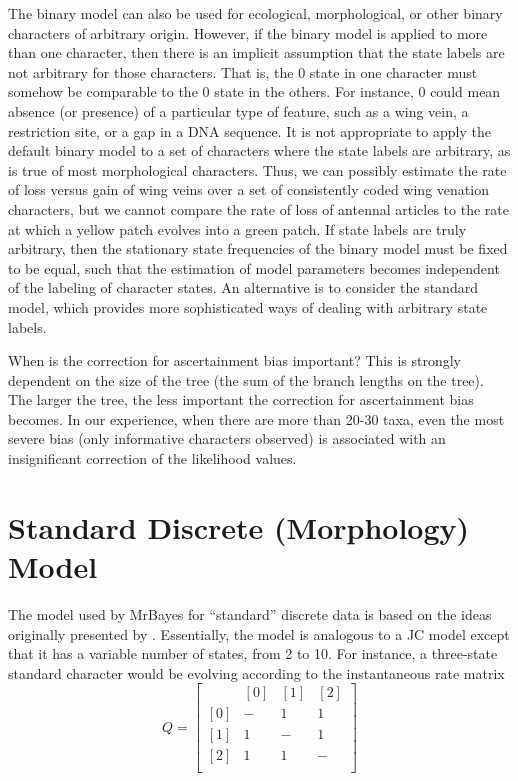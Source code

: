 \documentclass[12pt]{book}
\begin{document}
The binary model can also be used for ecological, morphological, or other binary characters of
arbitrary origin. However, if the binary model is applied to more than one character, then there is
an implicit assumption that the state labels are not arbitrary for those characters. That is, the 0
state in one character must somehow be comparable to the 0 state in the others. For instance, 0
could mean absence (or presence) of a particular type of feature, such as a wing vein, a
restriction site, or a gap in a DNA sequence. It is not appropriate to apply the default binary
model to a set of characters where the state labels are arbitrary, as is true of most morphological
characters. Thus, we can possibly estimate the rate of loss versus gain of wing veins over a set of
consistently coded wing venation characters, but we cannot compare the rate of loss of antennal
articles to the rate at which a yellow patch evolves into a green patch. If state labels are truly
arbitrary, then the stationary state frequencies of the binary model must be fixed to be equal,
such that the estimation of model parameters becomes independent of the labeling of character
states.  An alternative is to consider the standard model, which provides more sophisticated ways
of dealing with arbitrary state labels.

When is the correction for ascertainment bias important? This is strongly dependent on the size of
the tree (the sum of the branch lengths on the tree). The larger the tree, the less important the
correction for ascertainment bias becomes. In our experience, when there are more than 20-30 taxa,
even the most severe bias (only informative characters observed) is associated with an
insignificant correction of the likelihood values.

\section{Standard Discrete (Morphology) Model}
The model used by MrBayes for ``standard'' discrete data is based on the ideas originally presented
by \citet{lewis01}. Essentially, the model is analogous to a JC model except that it has a variable
number of states, from 2 to 10. For instance, a three-state standard character would be evolving
according to the instantaneous rate matrix
\[
Q=\begin{bmatrix}
    & [0] & [1] & [2]\\ 
 [0]& - & 1 & 1\\ 
 [1]& 1& -  & 1\\ 
 [2]& 1& 1  & -\\ 
\end{bmatrix}
\]
\end{document}
